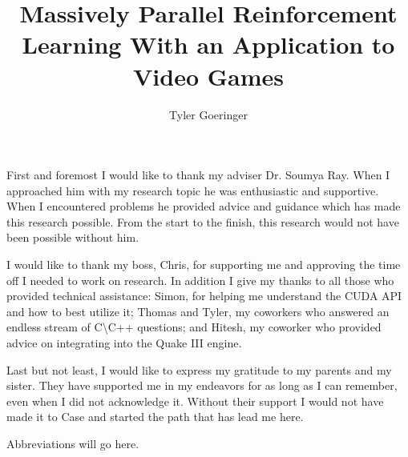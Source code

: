 \clearpage{}

\title{Massively Parallel Reinforcement Learning With an Application to Video Games}
\author{Tyler Goeringer}
\date{}
\maketitle


\committeeapprovalpage

\begin{acknowledgments}
First and foremost I would like to thank my adviser Dr. Soumya Ray. When I approached him with my research topic he was enthusiastic and supportive. When I encountered problems he provided advice and guidance which has made this research possible. From the start to the finish, this research would not have been possible without him.
    
I would like to thank my boss, Chris, for supporting me and approving the time off I needed to work on research. In addition I give my thanks to all those who provided technical assistance: Simon, for helping me understand the CUDA API and how to best utilize it; Thomas and Tyler, my coworkers who answered an endless stream of C\textbackslash C++ questions; and Hitesh, my coworker who provided advice on integrating into the Quake III engine.

Last but not least, I would like to express my gratitude to my parents and my sister. They have supported me in my endeavors for as long as I can remember, even when I did not acknowledge it. Without their support I would not have made it to Case and started the path that has lead me here.
\end{acknowledgments}

\tableofcontents
\listoftables
\listoffigures

\begin{abbreviations}
    Abbreviations will go here.
\end{abbreviations}

